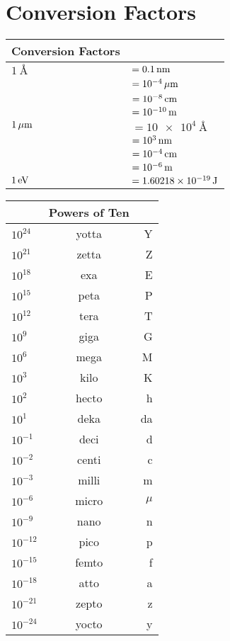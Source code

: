 \chapter*{Conversion Factors}
\begin{center}
\begin{longtable}[l]{p{150pt} p{150pt}} 
\toprule
	Conversion Factors & \\ 
\midrule
	$\SI{1}{\angstrom}$ & $= 0.1\,\mathrm{nm}$ \\
	& $= 10^{-4}\,\mathrm{\mu m}$ \\
	& $= 10^{-8}\,\mathrm{cm}$\\
	& $= 10^{-10}\,\mathrm{m}$\\
	$1\,\mathrm{\mu m}$ & $= \SI{10e4}{\angstrom}$\\
	& $= 10^3\,\mathrm{nm}$\\
	& $= 10^{-4}\,\mathrm{cm}$\\
	& $= 10^{-6}\,\mathrm{m}$\\
	$1\,\mathrm{eV}$ & $= 1.60218\times 10^{-19}\,\mathrm{J}$\\
\bottomrule
\end{longtable}
\end{center}

\begin{center}
\begin{tabular}{l c r}
	& Powers of Ten & \\
	\hline
	$10^{24}$ & yotta & Y \\
	$10^{21}$ & zetta & Z \\
	$10^{18}$ & exa & E\\
	$10^{15}$ & peta & P \\
	$10^{12}$ & tera & T\\
	$10^{9}$ & giga & G\\
	$10^{6}$ & mega & M\\
	$10^{3}$ & kilo & K\\
	$10^{2}$ & hecto & h\\
	$10^{1}$ & deka & da\\
	$10^{-1}$ & deci & d\\
	$10^{-2}$ & centi & c\\
	$10^{-3}$ & milli & m\\
	$10^{-6}$ & micro & $\mu$\\
	$10^{-9}$ & nano & n\\
	$10^{-12}$ & pico & p\\
	$10^{-15}$ & femto & f\\
	$10^{-18}$ & atto & a\\
	$10^{-21}$ & zepto & z\\
	$10^{-24}$ & yocto & y\\
	\hline
\end{tabular}
\end{center}


%
